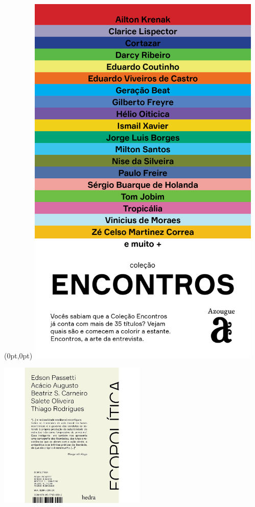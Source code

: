 \pagestyle{azougue}
\label{azougue}


\begin{textblock*}{5.625in}(0pt,0pt)%
\vspace*{-1.45cm}
\hspace*{-1.2cm}\includegraphics*[width=112mm]{./imgs/AZOUGUE.png}
\end{textblock*}

\pagebreak

\hspace{.5cm}

\begin{center}
\hspace*{-.5cm}\includegraphics[width=70mm]{eco.jpeg}
\end{center}

